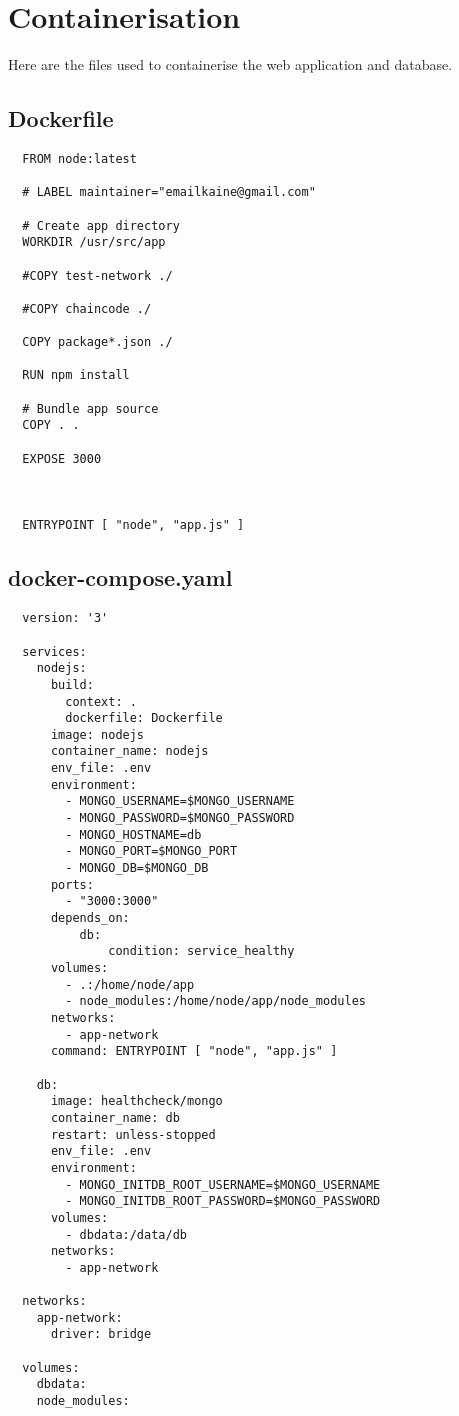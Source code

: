 \section{Containerisation}
Here are the files used to containerise the web application and database. \label{appendix:containerisation}
\subsection{Dockerfile}
\begin{lstlisting}
  FROM node:latest

  # LABEL maintainer="emailkaine@gmail.com"
  
  # Create app directory
  WORKDIR /usr/src/app
  
  #COPY test-network ./
  
  #COPY chaincode ./
  
  COPY package*.json ./
  
  RUN npm install
  
  # Bundle app source
  COPY . .
  
  EXPOSE 3000
  
  
  
  ENTRYPOINT [ "node", "app.js" ]
\end{lstlisting}

\subsection{docker-compose.yaml}
\begin{lstlisting}
  version: '3'

  services:
    nodejs:
      build:
        context: .
        dockerfile: Dockerfile
      image: nodejs
      container_name: nodejs
      env_file: .env
      environment:
        - MONGO_USERNAME=$MONGO_USERNAME
        - MONGO_PASSWORD=$MONGO_PASSWORD
        - MONGO_HOSTNAME=db
        - MONGO_PORT=$MONGO_PORT
        - MONGO_DB=$MONGO_DB
      ports:
        - "3000:3000"
      depends_on: 
          db:
              condition: service_healthy
      volumes:
        - .:/home/node/app
        - node_modules:/home/node/app/node_modules
      networks:
        - app-network
      command: ENTRYPOINT [ "node", "app.js" ]
  
    db:
      image: healthcheck/mongo
      container_name: db
      restart: unless-stopped
      env_file: .env
      environment:
        - MONGO_INITDB_ROOT_USERNAME=$MONGO_USERNAME
        - MONGO_INITDB_ROOT_PASSWORD=$MONGO_PASSWORD
      volumes:
        - dbdata:/data/db
      networks:
        - app-network
  
  networks:
    app-network:
      driver: bridge
  
  volumes:
    dbdata:
    node_modules:
\end{lstlisting}